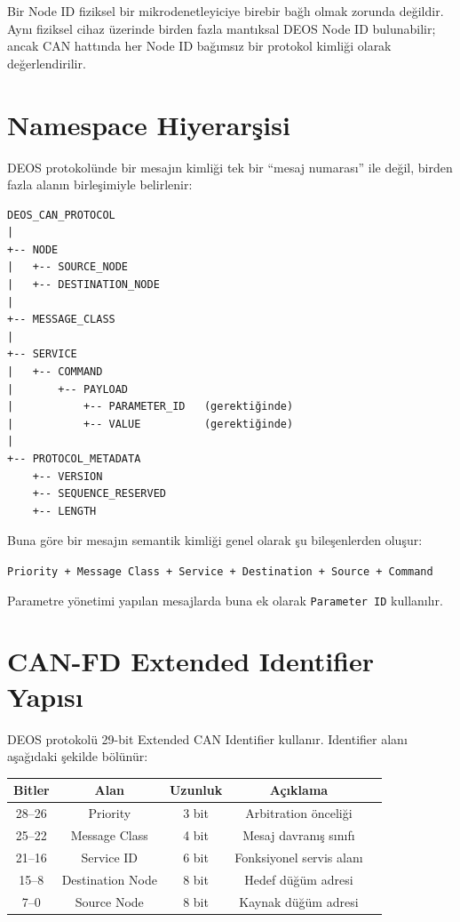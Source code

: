\documentclass[a4paper,10pt]{article}
\newcommand{\code}[1]{\texttt{#1}}
\begin{document}
Bir Node ID fiziksel bir mikrodenetleyiciye birebir bağlı olmak zorunda değildir. Aynı
fiziksel cihaz üzerinde birden fazla mantıksal DEOS Node ID bulunabilir; ancak CAN hattında
her Node ID bağımsız bir protokol kimliği olarak değerlendirilir.

\section{Namespace Hiyerarşisi}

DEOS protokolünde bir mesajın kimliği tek bir ``mesaj numarası'' ile değil, birden fazla
alanın birleşimiyle belirlenir:

\begin{verbatim}
DEOS_CAN_PROTOCOL
|
+-- NODE
|   +-- SOURCE_NODE
|   +-- DESTINATION_NODE
|
+-- MESSAGE_CLASS
|
+-- SERVICE
|   +-- COMMAND
|       +-- PAYLOAD
|           +-- PARAMETER_ID   (gerektiğinde)
|           +-- VALUE          (gerektiğinde)
|
+-- PROTOCOL_METADATA
    +-- VERSION
    +-- SEQUENCE_RESERVED
    +-- LENGTH
\end{verbatim}

Buna göre bir mesajın semantik kimliği genel olarak şu bileşenlerden oluşur:

\begin{center}
\code{Priority + Message Class + Service + Destination + Source + Command}
\end{center}

Parametre yönetimi yapılan mesajlarda buna ek olarak \code{Parameter ID} kullanılır.

\section{CAN-FD Extended Identifier Yapısı}

DEOS protokolü 29-bit Extended CAN Identifier kullanır. Identifier alanı aşağıdaki
şekilde bölünür:

\begin{center}
\begin{tabular}{c c c c c}
\toprule
Bitler & Alan & Uzunluk & Açıklama \\
\midrule
28--26 & Priority & 3 bit & Arbitration önceliği \\
25--22 & Message Class & 4 bit & Mesaj davranış sınıfı \\
21--16 & Service ID & 6 bit & Fonksiyonel servis alanı \\
15--8  & Destination Node & 8 bit & Hedef düğüm adresi \\
7--0   & Source Node & 8 bit & Kaynak düğüm adresi \\
\bottomrule
\end{tabular}
\end{center}
\end{document}
